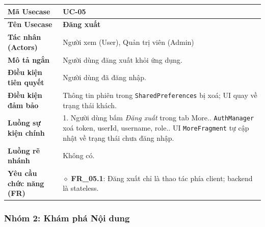 \begin{table}[H]
\renewcommand{\arraystretch}{1.3}
\centering
\begin{tabularx}{\textwidth}{|p{4.5cm}|X|}
\hline
\cellcolor{gray!15}\bfseries Mã Usecase & \textbf{UC-05} \\ \hline
\cellcolor{gray!15}\bfseries Tên Usecase & \textbf{Đăng xuất} \\ \hline
\cellcolor{gray!15}\bfseries Tác nhân (Actors) & Người xem (User), Quản trị viên (Admin) \\ \hline
\cellcolor{gray!15}\bfseries Mô tả ngắn & Người dùng đăng xuất khỏi ứng dụng. \\ \hline
\cellcolor{gray!15}\bfseries Điều kiện tiên quyết & Người dùng đã đăng nhập. \\ \hline
\cellcolor{gray!15}\bfseries Điều kiện đảm bảo & Thông tin phiên trong \texttt{SharedPreferences} bị xoá; UI quay về trạng thái khách. \\ \hline
\cellcolor{gray!15}\bfseries Luồng sự kiện chính & 1. Người dùng bấm \textit{Đăng xuất} trong tab More.\newline 2. \texttt{AuthManager} xoá token, userId, username, role.\newline 3. UI \texttt{MoreFragment} tự cập nhật về trạng thái chưa đăng nhập. \\ \hline
\cellcolor{gray!15}\bfseries Luồng rẽ nhánh & Không có. \\ \hline
\cellcolor{gray!15}\bfseries Yêu cầu chức năng (FR) & $\diamond$ \textbf{FR\_05.1}: Đăng xuất chỉ là thao tác phía client; backend là stateless. \\ \hline
\end{tabularx}
\end{table}


\subsubsection*{Nhóm 2: Khám phá Nội dung}

